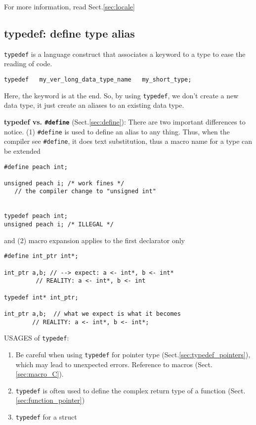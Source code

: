 For more information, read Sect.\ref{sec:locale}

\subsection{typedef: define type alias}
\label{sec:typedef}


\verb!typedef! is a language construct that associates a keyword to a type to
ease the reading of code. 
\begin{verbatim}
typedef   my_ver_long_data_type_name   my_short_type;
\end{verbatim}
Here, the keyword is at the end. So, by using \verb!typedef!, we don't create a
new data type, it just create an aliases to an existing data type. 

{\bf typedef vs. \verb!#define! } (Sect.\ref{sec:define}): There are two
important differences to notice. (1) \verb!#define! is used to define an alias
to any thing. Thus, when the compiler see \verb!#define!, it does text
substitution, thus a macro name for a type can be extended
\begin{verbatim}
#define peach int;

unsigned peach i; /* work fines */
   // the compiler change to "unsigned int"


typedef peach int;
unsigned peach i; /* ILLEGAL */
\end{verbatim}
and (2) macro expansion applies to the first declarator only
\begin{verbatim}
#define int_ptr int*;

int_ptr a,b; // --> expect: a <- int*, b <- int*
         // REALITY: a <- int*, b <- int
         
typedef int* int_ptr;

int_ptr a,b;  // what we expect is what it becomes
        // REALITY: a <- int*, b <- int*;         
\end{verbatim}

USAGES of \verb!typedef!:
\begin{enumerate}
  \item  Be careful when using \verb!typedef! for pointer type
(Sect.\ref{sec:typedef_pointers}), which may lead to unexpected errors.
Reference to macros (Sect.\ref{sec:macro_C}).
   \item \verb!typedef! is often used to define the complex return type of a
   function (Sect.\ref{sec:function_pointer})
   
   \item \verb!typedef! for a struct
\end{enumerate}
   


